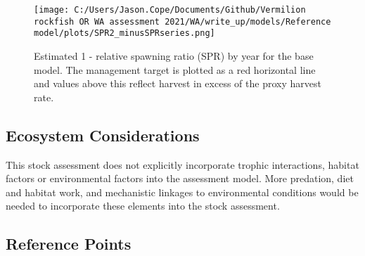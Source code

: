 \documentclass[11pt,
  english,
  a4paper,
]{article}
\begin{document}
\leavevmode\tagmcend\tagstructend\par




\begin{figure}
\centering
\texttt{[image: C:/Users/Jason.Cope/Documents/Github/Vermilion rockfish OR WA assessment 2021/WA/write\_up/models/Reference model/plots/SPR2\_minusSPRseries.png]}
\caption{Estimated 1 - relative spawning ratio (SPR) by year for the base model. The management target is plotted as a red horizontal line and values above this reflect harvest in excess of the proxy harvest rate.\label{fig:es-1-spr}}
\end{figure}

\tagmcend\tagstructend

\clearpage


\hypertarget{ecosystem-considerations}{%
\subsection*{Ecosystem Considerations}\label{ecosystem-considerations}}

\leavevmode\tagmcend\tagstructend


This stock assessment does not explicitly incorporate trophic interactions, habitat factors or environmental factors into the assessment model. More predation, diet and habitat work, and mechanistic linkages to environmental conditions would be needed to incorporate these elements into the stock assessment.

\leavevmode\tagmcend\tagstructend\par


\hypertarget{reference-points}{%
\subsection*{Reference Points}\label{reference-points}}
\end{document}
